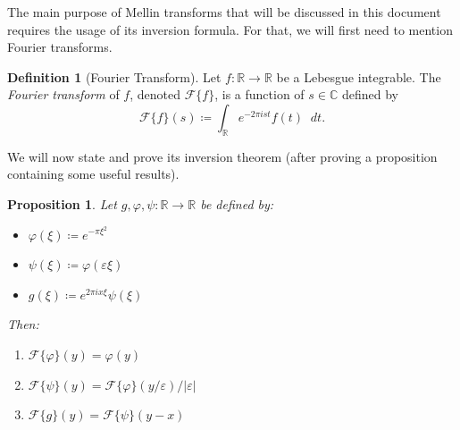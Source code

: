 \documentclass[a4paper]{article}
\newcommand*\diff{\mathop{}\!d} %
\newcommand{\R}{\mathbb{R}}
\newcommand{\C}{\mathbb{C}}
\newtheorem{proposition}[theorem]{Proposition}
\theoremstyle{definition}
\newtheorem{definition}[theorem]{Definition}
\begin{document}
The main purpose of Mellin transforms that will be discussed in this document requires the usage of its inversion formula.
For that, we will first need to mention Fourier transforms.
\begin{definition}[Fourier Transform]
    Let $f \colon \R \to \R$ be a Lebesgue integrable.
    The \emph{Fourier transform} of $f$, denoted $\mathcal{F}\{f\}$, is a function of $s \in \C$ defined by
    \begin{equation}
        \mathcal{F}\{f\}(s) \coloneq \int_\R e^{-2\pi i s t} f(t) \diff t.
    \end{equation}
\end{definition}
We will now state and prove its inversion theorem (after proving a proposition containing some useful results).
\begin{proposition} \label{thm:FIT results}
    Let $g, \varphi, \psi \colon \R \to \R$ be defined by:
    \begin{itemize}
        \item $\varphi (\xi) \coloneq e^{-\pi \xi^2}$
        \item $\psi (\xi) \coloneq \varphi (\varepsilon \xi)$
        \item $g(\xi) \coloneq e^{2\pi i x \xi} \psi(\xi)$
    \end{itemize}
    Then:
    \begin{enumerate}[label=(\alph*)]
        \item $\mathcal{F}\{\varphi\}(y) = \varphi (y)$
        \item $\mathcal{F}\{\psi\}(y) = \mathcal{F}\{\varphi\}(y/\varepsilon) / \lvert \varepsilon \rvert$
        \item $\mathcal{F}\{g\}(y) = \mathcal{F}\{\psi\}(y-x)$
    \end{enumerate}
\end{proposition}
\end{document}
